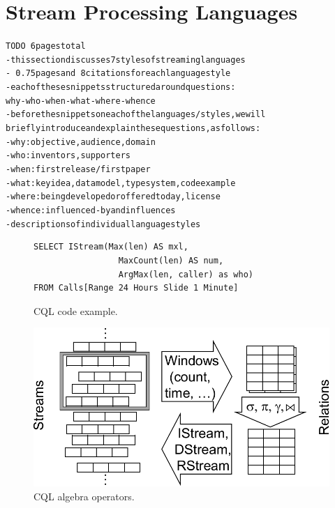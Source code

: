 \section{Stream Processing Languages}\label{sec:languages}

\begin{alltt}TODO\scriptsize ~6 pages total
- this section discusses 7 styles of streaming languages
  - ~0.75 pages and ~8 citations for each language style
  - each of these snippets structured around questions:
    why-who-when-what-where-whence
- before the snippets on each of the languages/styles, we will
  briefly introduce and explain these questions, as follows:
  - why: objective, audience, domain
  - who: inventors, supporters
  - when: first release / first paper
  - what: key idea, data model, type system, code example
  - where: being developed or offered today, license
  - whence: influenced-by and influences
- descriptions of individual language styles
\end{alltt}

\begin{figure}[!h]
\begin{lstlisting}
SELECT IStream(Max(len) AS mxl,
                 MaxCount(len) AS num,
                 ArgMax(len, caller) as who)
FROM Calls[Range 24 Hours Slide 1 Minute]
\end{lstlisting}
\vspace*{-4mm}
\caption{\label{fig:cql}CQL code example.}
\end{figure}

\begin{figure}
\centerline{\includegraphics[scale=0.4]{cqlops.pdf}}
\vspace*{-4mm}
\caption{\label{fig:cqlops}CQL algebra operators.}
\end{figure}

